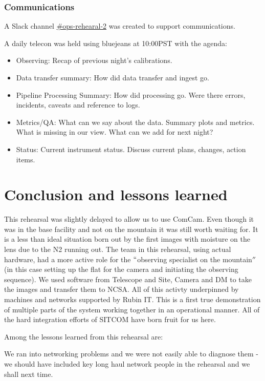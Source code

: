 \subsubsection{Communications }


A Slack channel \href{https://lsstc.slack.com/messages/CJBSY6FUN}{\#ops-rehearal-2} was created to support communications.

A daily telecon was held using bluejeans at 10:00PST with the agenda:
\begin{itemize}
\item Observing: Recap of previous night's calibrations.
\item Data transfer summary:  How did data transfer and ingest go.
\item Pipeline Processing Summary: 	How did processing go.  Were there errors, incidents, caveats and reference to logs.
\item Metrics/QA:  What can we say about the data. Summary plots and metrics.  What is missing in our view. What can we add for next night?
\item Status:   Current instrument status.  Discuss current plans, changes, action items.

\end{itemize}







\section{Conclusion and lessons learned}\label{sec:conc}
This rehearsal was slightly delayed to allow us to use ComCam. Even though it was in the base facility and not on the mountain it was still worth waiting for.
It is a less than ideal situation born out by the first images with moisture on the lens due to the N2 running out.
The team in this rehearsal, using actual hardware, had a more active role for the $``$observing specialist on the mountain$''$ (in this case setting up the flat for the camera and initiating the observing sequence).
We used software from Telescope and Site, Camera and DM to take the images and transfer them to NCSA.
All of this activty underpinned by machines and networks supported by Rubin IT.
This is a first true demonstration of multiple parts of the system working together in an operational manner.
All of the hard integration efforts of SITCOM have born fruit for us here.

Among the lessons learned from this rehearsal are:
\item We ran into networking problems and we were not easily able to diagnose them - we should have included key long haul network people in the rehearsal and we shall next time.

